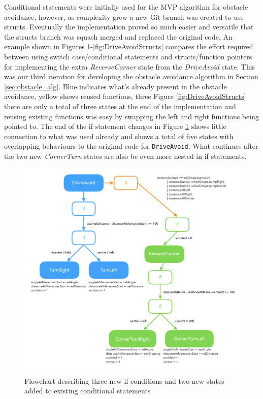 Conditional statements were initially used for the MVP algorithm for obstacle avoidance, however, as complexity grew a new Git branch was created to use structs. Eventually the implementation proved so much easier and versatile that the structs branch was squash merged and replaced the original code. An example shown in Figures \ref{fig:DriveAvoidIfs}-\ref{fig:DriveAvoidStructs} compares the effort required between using switch case/conditional statements and structs/function pointers for implementing the extra \textit{ReverseCorner} state from the \textit{DriveAvoid} state. This was our third iteration for developing the obstacle avoidance algorithm in Section \ref{sec:obstacle_alg}. Blue indicates what's already present in the obstacle avoidance, yellow shows reused functions, three Figure \ref{fig:DriveAvoidStructs} there are only a total of three states at the end of the implementation and reusing existing functions was easy by swapping the left and right functions being pointed to. The end of the if statement changes in Figure \ref{fig:DriveAvoidIfs} shows little connection to what was used already and shows a total of five states with overlapping behaviours to the original code for \texttt{DriveAvoid}. What continues after the two new \textit{CornerTurn} states are also be even more nested in if statements.\\
\begin{figure}[H]
    \centering
    \includegraphics[width=12cm]{Images/DriveAvoidIfs.png}
    \caption{Flowchart describing three new if conditions and two new states added to existing conditional statements}
    \label{fig:DriveAvoidIfs}
\end{figure}
